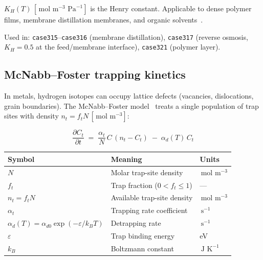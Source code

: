 \documentclass[11pt,a4paper]{article}
\newcommand{\pder}[2]{\frac{\partial #1}{\partial #2}}
\newcommand{\mol}{\,\text{mol}}
\newcommand{\m}{\,\text{m}}
\newcommand{\K}{\,\text{K}}
\newcommand{\s}{\,\text{s}}
\newcommand{\Pa}{\,\text{Pa}}
\newcommand{\J}{\,\text{J}}
\newcommand{\caseref}[1]{\texttt{\color{casegreen}#1}}
\begin{document}
$K_H(T)\,[\mol\,\m^{-3}\,\Pa^{-1}]$ is the Henry constant.  Applicable to
dense polymer films, membrane distillation membranes, and organic solvents~\cite{Baker2012}.

\begin{tcolorbox}[casebox]
  Used in: \caseref{case315}–\caseref{case316} (membrane distillation),
  \caseref{case317} (reverse osmosis, $K_H = 0.5$ at the feed/membrane
  interface), \caseref{case321} (polymer layer).
\end{tcolorbox}

\subsection{McNabb--Foster trapping kinetics}
\label{sec:trap}

In metals, hydrogen isotopes can occupy lattice defects (vacancies,
dislocations, grain boundaries).  The McNabb--Foster model~\cite{McNabb1963}
treats a single population of trap sites with density
$n_t = f_t N\,[\mol\,\m^{-3}]$:

\begin{tcolorbox}[eqbox,title={McNabb--Foster ODE}]
\begin{equation}\label{eq:trap}
  \pder{C_t}{t}
  \;=\;
  \frac{\alpha_t}{N}\,C\,(n_t - C_t)
  \;-\;
  \alpha_d(T)\,C_t
\end{equation}
\end{tcolorbox}

\begin{center}
\begin{tabular}{lll}
\toprule
Symbol & Meaning & Units \\
\midrule
$N$      & Molar trap-site density               & $\mol\,\m^{-3}$ \\
$f_t$    & Trap fraction ($0 < f_t \le 1$)        & --- \\
$n_t = f_t N$ & Available trap-site density      & $\mol\,\m^{-3}$ \\
$\alpha_t$ & Trapping rate coefficient             & $\s^{-1}$ \\
$\alpha_d(T) = \alpha_{d0}\exp(-\varepsilon/k_B T)$ & Detrapping rate & $\s^{-1}$ \\
$\varepsilon$ & Trap binding energy               & eV \\
$k_B$    & Boltzmann constant                     & $\J\,\K^{-1}$ \\
\bottomrule
\end{tabular}
\end{center}
\end{document}
